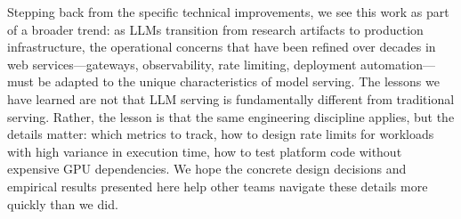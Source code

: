 \documentclass[10pt,journal]{IEEEtran}
\begin{document}
Stepping back from the specific technical improvements, we see this work as part of a broader trend: as LLMs transition from research artifacts to production infrastructure, the operational concerns that have been refined over decades in web services---gateways, observability, rate limiting, deployment automation---must be adapted to the unique characteristics of model serving. The lessons we have learned are not that LLM serving is fundamentally different from traditional serving. Rather, the lesson is that the same engineering discipline applies, but the details matter: which metrics to track, how to design rate limits for workloads with high variance in execution time, how to test platform code without expensive GPU dependencies. We hope the concrete design decisions and empirical results presented here help other teams navigate these details more quickly than we did.
\end{document}
